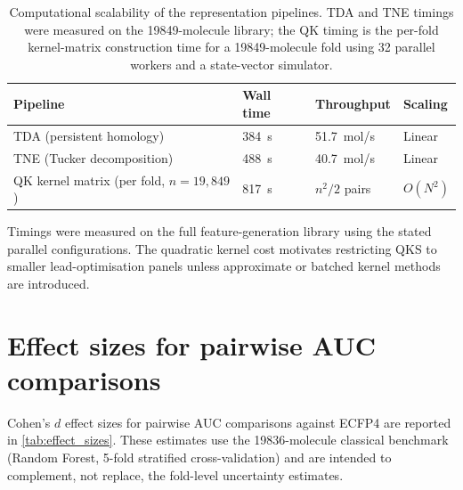 \documentclass[11pt,a4paper]{article}
\begin{document}
\begin{table}[htbp]
\centering
\caption{Computational scalability of the representation pipelines. TDA and TNE timings were measured on the \num{19849}-molecule library; the QK timing is the per-fold kernel-matrix construction time for a \num{19849}-molecule fold using 32 parallel workers and a state-vector simulator.}
\label{tab:scalability}
\begin{tabularx}{\textwidth}{l l l l}
\toprule
Pipeline & {Wall time} & {Throughput} & {Scaling} \\
\midrule
TDA (persistent homology) & \SI{384}{\second} & 51.7~mol/s & Linear \\
TNE (Tucker decomposition) & \SI{488}{\second} & 40.7~mol/s & Linear \\
QK kernel matrix (per fold, $n=19{,}849$) & \SI{817}{\second} & $n^2/2$ pairs & $O(N^2)$ \\
\bottomrule
\end{tabularx}
\vspace{1mm}
\footnotesize Timings were measured on the full feature-generation library using the stated parallel configurations. The quadratic kernel cost motivates restricting QKS to smaller lead-optimisation panels unless approximate or batched kernel methods are introduced.
\end{table}


\section{Effect sizes for pairwise AUC comparisons}
\label{SM-sec:effect_sizes}

Cohen's $d$ effect sizes for pairwise AUC comparisons against ECFP4 are reported in \cref{tab:effect_sizes}. These estimates use the \num{19836}-molecule classical benchmark (Random Forest, 5-fold stratified cross-validation) and are intended to complement, not replace, the fold-level uncertainty estimates.
\end{document}
